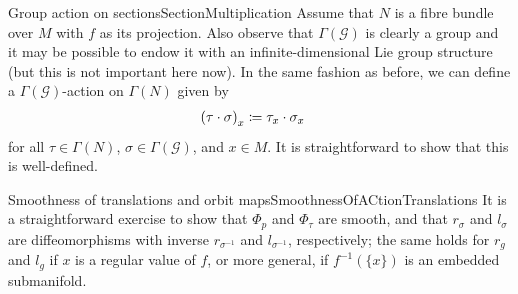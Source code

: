 \documentclass[reqno,a4paper,oneside]{amsart}
\theoremstyle{plain}
\theoremstyle{remark}
\theoremstyle{definition}
\def\bas#1\eas{\begin{align*}#1\end{align*}}
\begin{document}
\begin{remarks}{Group action on sections}{SectionMultiplication}
Assume that $N$ is a fibre bundle over $M$ with $f$ as its projection. Also observe that $\Gamma(\mathcal{G})$ is clearly a group and it may be possible to endow it with an infinite-dimensional Lie group structure (but this is not important here now). In the same fashion as before, we can define a $\Gamma(\mathcal{G})$-action on $\Gamma(N)$ given by
\begin{align*}
\mleft(\tau \cdot \sigma\mright)_x
&\coloneqq
\tau_x \cdot \sigma_x
\end{align*}
for all $\tau \in \Gamma(N)$, $\sigma \in \Gamma(\mathcal{G})$, and $x \in M$. It is straightforward to show that this is well-defined.
\end{remarks}

\begin{remarks}{Smoothness of translations and orbit maps}{SmoothnessOfACtionTranslations}
It is a straightforward exercise to show that $\Phi_p$ and $\Phi_\tau$ are smooth, and that $r_\sigma$ and $l_\sigma$ are diffeomorphisms with inverse $r_{\sigma^{-1}}$ and $l_{\sigma^{-1}}$, respectively; the same holds for $r_g$ and $l_g$ if $x$ is a regular value of $f$, or more general, if $f^{-1}(\{x\})$ is an embedded submanifold.
%

\end{remarks}
\end{document}
